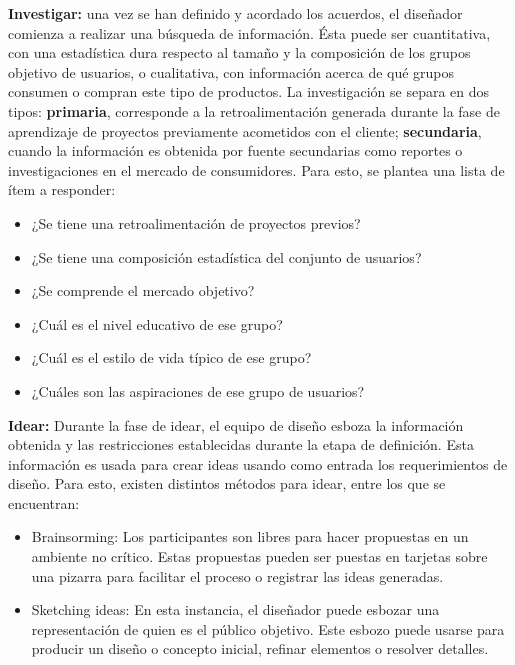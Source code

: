\begin{description}
\item \textbf{Investigar:} una vez se han definido y acordado los acuerdos, el diseñador comienza a realizar una búsqueda de información. Ésta puede ser cuantitativa, con una estadística dura respecto al tamaño y la composición de los grupos objetivo de usuarios, o cualitativa, con información acerca de qué grupos consumen o compran este tipo de productos. La investigación se separa en dos tipos: \textbf{primaria}, corresponde a la retroalimentación generada durante la fase de aprendizaje de proyectos previamente acometidos con el cliente; \textbf{secundaria}, cuando la información es obtenida por fuente secundarias como reportes o investigaciones en el mercado de consumidores. Para esto, se plantea una lista de ítem a responder:
\begin{itemize}
\item ¿Se tiene una retroalimentación de proyectos previos?
\item ¿Se tiene una composición estadística del conjunto de usuarios?
\item ¿Se comprende el mercado objetivo?
\item ¿Cuál es el nivel educativo de ese grupo?
\item ¿Cuál es el estilo de vida típico de ese grupo?
\item ¿Cuáles son las aspiraciones de ese grupo de usuarios?
\end{itemize}


\item \textbf{Idear:} Durante la fase de idear, el equipo de diseño esboza la información obtenida y las restricciones establecidas durante la etapa de definición. Esta información es usada para crear ideas usando como entrada los requerimientos de diseño. Para esto, existen distintos métodos para idear, entre los que se encuentran:
\begin{itemize}
\item Brainsorming: Los participantes son libres para hacer propuestas en un ambiente no crítico. Estas propuestas pueden ser puestas en tarjetas sobre una pizarra para facilitar el proceso o registrar las ideas generadas.
\item Sketching ideas: En esta instancia, el diseñador puede esbozar una representación de quien es el público objetivo. Este esbozo puede usarse para producir un diseño o concepto inicial, refinar elementos o resolver detalles.
\end{itemize}


\end{description}
